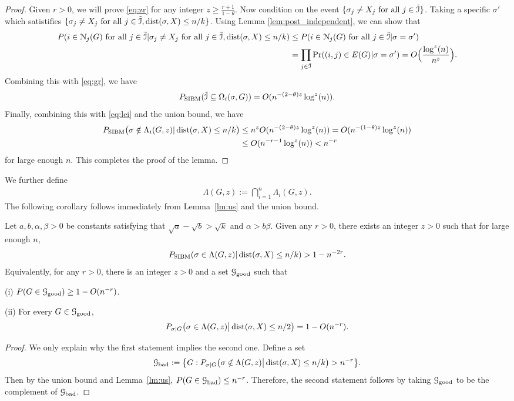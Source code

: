 \documentclass{article}
\begin{document}
\begin{proof}
Given $r>0$, we will prove \eqref{eq:zr} for any integer $z\ge \frac{r+1}{1-\theta}$. 
Now condition on the event $\{\sigma_j \neq X_j \text{~for all~} j\in \tilde{\mathcal{I}}\}$.
Taking a specific $\sigma'$ which satistifies  $\{\sigma_j \neq X_j \text{~for all~} j \in \tilde{\mathcal{I}}, \operatorname{dist}(\sigma, X) \le n/k\}$.
Using Lemma \ref{lem:post_independent}, we can show that
\begin{align*}
P(i\in\mathcal{N}_j(G) \text{~for all~} j\in \tilde{\mathcal{I}} | \sigma_j \neq X_j \text{~for all~} j \in \tilde{\mathcal{I}}, \operatorname{dist}(\sigma, X) \le n/k) &\leq P(i\in\mathcal{N}_j(G) \text{~for all~} j\in \tilde{\mathcal{I}} | \sigma =\sigma')\\
&=\prod_{j\in \tilde{\mathcal{I}}}\Pr((i,j)\in E(G) | \sigma = \sigma') =  O\Big( \frac{\log^z(n)}{n^z} \Big) .
\end{align*}
Combining this with \eqref{eq:gr}, we have
$$
P_{\operatorname{SIBM}} (\tilde{\mathcal{I}} \subseteq \Omega_i(\sigma,G))
= O (n^{-(2-\theta)z}\log^z(n)) .
$$
Finally, combining this with \eqref{eq:lei} and the union bound, we have
\begin{align*}
P_{\operatorname{SIBM}} \big(\sigma\notin \Lambda_i(G, z)
| \operatorname{dist}(\sigma, X) \le n/k \big)
& \le n^z O (n^{-(2-\theta)z}\log^z(n))
= O (n^{-(1-\theta)z}\log^z(n))  \\
& \le O (n^{-r-1}\log^z(n)) <n^{-r}
\end{align*}
for large enough $n$. This completes the proof of the lemma.
\end{proof}
We further define 
\begin{align*}
\Lambda(G, z) :=
\bigcap_{i=1}^n
\Lambda_i(G, z) .
\end{align*}
The following corollary follows immediately from Lemma~\ref{lm:us} and the union bound.
\begin{corollary} \label{cr:1}
Let $a,b,\alpha,\beta> 0$ be constants satisfying that $\sqrt{a}-\sqrt{b} > \sqrt{k}$ and $\alpha>b\beta$.
Given any $r>0$, there exists an integer $z>0$ such that for large enough $n$, 
$$
P_{\operatorname{SIBM}} (\sigma\in \Lambda(G, z)
| \operatorname{dist}(\sigma, X) \le n/k)
> 1 - n^{-2r} .
$$
Equivalently, for any $r>0$, there is an integer $z>0$ and a set $\mathcal{G}_{\operatorname{good}}$ such that

\noindent (i)
$P(G\in\mathcal{G}_{\operatorname{good}}) \ge 1- O(n^{-r})$.

\noindent (ii) For every $G\in\mathcal{G}_{\operatorname{good}}$,
$$
P_{\sigma|G} \big( \sigma \in  \Lambda(G, z)  \big| \operatorname{dist}(\sigma, X) \le n/2 \big) =1- O(n^{-r}).
$$
\end{corollary}
\begin{proof}
We only explain why the first statement implies the second one.
Define a set 
$$
\mathcal{G}_{\operatorname{bad}}:= \big\{ G: P_{\sigma|G} \big( \sigma \notin  \Lambda(G, z)  \big| \operatorname{dist}(\sigma, X) \le n/k \big)
>n^{-r} \big\} .
$$
Then by the union bound and Lemma~\ref{lm:us}, $P(G\in\mathcal{G}_{\operatorname{bad}})\le n^{-r}$. Therefore, the second statement follows by taking $\mathcal{G}_{\operatorname{good}}$ to be the complement of $\mathcal{G}_{\operatorname{bad}}$.
\end{proof}
\end{document}
